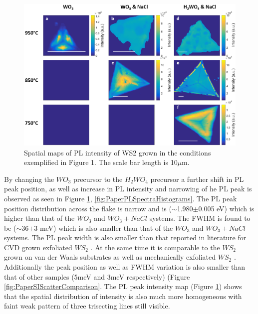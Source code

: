 \documentclass[12pt]{article}
\begin{document}
\begin{figure}[h]
\begin{center}
\includegraphics[scale=0.3]{PaperPLMaps.png}
\caption{Spatial maps of PL intensity of WS2 grown in the conditions exemplified in Figure 1. The scale bar length is 10$\mu$m.}
\label{fig:PaperPLMaps}
\end{center}
\end{figure}

By changing the $WO_3$ precursor to the $H_2WO_4$ precursor a further shift in PL peak position, as well as increase in PL intensity and narrowing of he PL peak is observed as seen in Figure \ref{fig:PaperPLMaps}, \ref{fig:PaperPLSpectraHistograms}. The PL peak position distribution across the flake is narrow and is ({$\sim$}1.980{$\pm$}0.005 eV) which is higher than that of the $WO_3$ and $WO_3 + NaCl$ systems. The FWHM is found to be ({$\sim$}36{$\pm$}3 meV) which is also smaller than that of the $WO_3$ and $WO_3 + NaCl$ systems. The PL peak width is also smaller than that reported in literature for CVD grown \cite{ExtraordinaryRoomTemperaturePhotoluminescenceInTriangularWS2Monolayers}\cite{Rong2014}\cite{Hu2016}\cite{Kang2015a} exfoliated $WS_2$ \cite{EvolutionOfElectronicStructureInAtomicallyThinSheetsOfWS2AndWSe2}\cite{doi:10.1021/nn5059908}. At the same time it is comparable to the $WS_2$ grown on van der Waals substrates \cite{doi:10.1021/nn503093k} as well as mechanically exfoliated $WS_2$ \cite{doi:10.1021/nl500171v}. Additionally the peak position as well as FWHM variation is also smaller than that of other samples (5meV and 3meV respectively) (Figure \ref{fig:PaperSIScatterComparison}. The PL peak intensity map (Figure \ref{fig:PaperPLMaps}) shows that the spatial distribution of intensity is also much more homogeneous with faint weak pattern of three trisecting lines still visible.
\end{document}

